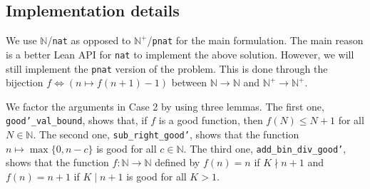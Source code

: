 \documentclass{article}
\newcommand{\N}{\mathbb{N}}
\begin{document}
\subsection*{Implementation details}

We use $\N$/\texttt{nat} as opposed to $\N^+$/\texttt{pnat} for the main formulation.
The main reason is a better Lean API for \texttt{nat} to implement the above solution.
However, we will still implement the \texttt{pnat} version of the problem.
This is done through the bijection $f \iff (n \mapsto f(n + 1) - 1)$ between $\N \to \N$ and $\N^+ \to \N^+$.

We factor the arguments in Case 2 by using three lemmas.
The first one, \texttt{good'\_val\_bound}, shows that, if $f$ is a good function, then $f(N) \leq N + 1$ for all $N \in \N$.
The second one, \texttt{sub\_right\_good'}, shows that the function $n \mapsto \max\{0, n - c\}$ is good for all $c \in \N$.
The third one, \texttt{add\_bin\_div\_good'}, shows that the function $f : \N \to \N$ defined by $f(n) = n$ if $K \nmid n + 1$ and $f(n) = n + 1$ if $K \mid n + 1$ is good for all $K > 1$.
\end{document}
